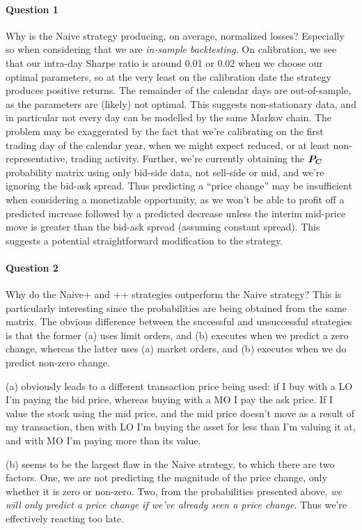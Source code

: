 \paragraph{Question 1} Why is the Naive strategy producing, on average, normalized losses? Especially so when considering that we are \emph{in-sample backtesting}. On calibration, we see that our intra-day Sharpe ratio is around 0.01 or 0.02 when we choose our optimal parameters, so at the very least on the calibration date the strategy produces positive returns. The remainder of the calendar days are out-of-sample, as the parameters are (likely) not optimal. This suggests non-stationary data, and in particular not every day can be modelled by the same Markov chain. The problem may be exaggerated by the fact that we're calibrating on the first trading day of the calendar year, when we might expect reduced, or at least non-representative, trading activity. Further, we're currently obtaining the $\boldsymbol{P_C}$ probability matrix using only bid-side data, not sell-side or mid, and we're ignoring the bid-ask spread. Thus predicting a ``price change'' may be insufficient when considering a monetizable opportunity, as we won't be able to profit off a predicted increase followed by a predicted decrease unless the interim mid-price move is greater than the bid-ask spread (assuming constant spread). This suggests a potential straightforward modification to the strategy.

\paragraph{Question 2} Why do the Naive+ and ++ strategies outperform the Naive strategy? This is particularly interesting since the probabilities are being obtained from the same matrix. The obvious difference between the successful and unsuccessful strategies is that the former (a) uses limit orders, and (b) executes when we predict a zero change, whereas the latter uses (a) market orders, and (b) executes when we do predict non-zero change.

(a) obviously leads to a different transaction price being used: if I buy with a LO I'm paying the bid price, whereas buying with a MO I pay the ask price. If I value the stock using the mid price, and the mid price doesn't move as a result of my transaction, then with LO I'm buying the asset for less than I'm valuing it at, and with MO I'm paying more than its value.

(b) seems to be the largest flaw in the Naive strategy, to which there are two factors. One, we are not predicting the magnitude of the price change, only whether it is zero or non-zero. Two, from the probabilities presented above, \textit{we will only predict a price change if we've already seen a price change}. Thus we're effectively reacting too late. 

